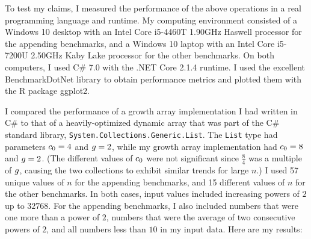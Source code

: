To test my claims, I measured the performance of the above operations in a real programming language and runtime. My computing environment consisted of a Windows 10 desktop with an Intel Core i5-4460T 1.90GHz Haswell processor for the appending benchmarks, and a Windows 10 laptop with an Intel Core i5-7200U 2.50GHz Kaby Lake processor for the other benchmarks. On both computers, I used C\# 7.0 with the .NET Core 2.1.4 runtime. I used the excellent BenchmarkDotNet library to obtain performance metrics and plotted them with the R package ggplot2.

I compared the performance of a growth array implementation I had written in C\# to that of a heavily-optimized dynamic array that was part of the C\# standard library, \texttt{System.Collections.Generic.List}. The \texttt{List} type had parameters $c_0 = 4$ and $g = 2$, while my growth array implementation had $c_0 = 8$ and $g = 2$. (The different values of $c_0$ were not significant since $\frac{8}{4}$ was a multiple of $g$, causing the two collections to exhibit similar trends for large $n$.) I used 57 unique values of $n$ for the appending benchmarks, and 15 different values of $n$ for the other benchmarks. In both cases, input values included increasing powers of $2$ up to $32768$. For the appending benchmarks, I also included numbers that were one more than a power of $2$, numbers that were the average of two consecutive powers of $2$, and all numbers less than $10$ in my input data. Here are my results:

